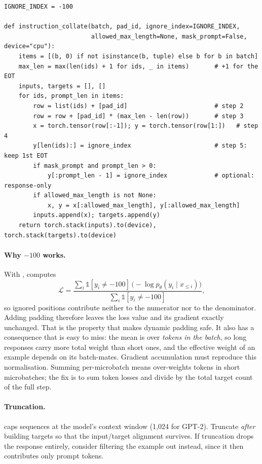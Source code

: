 \begin{lstlisting}[caption={The instruction collate function (from \ident{llmsys/finetune.py}).},label={lst:instruct:collate}]
IGNORE_INDEX = -100

def instruction_collate(batch, pad_id, ignore_index=IGNORE_INDEX,
                        allowed_max_length=None, mask_prompt=False, device="cpu"):
    items = [(b, 0) if not isinstance(b, tuple) else b for b in batch]
    max_len = max(len(ids) + 1 for ids, _ in items)       # +1 for the EOT
    inputs, targets = [], []
    for ids, prompt_len in items:
        row = list(ids) + [pad_id]                        # step 2
        row = row + [pad_id] * (max_len - len(row))       # step 3
        x = torch.tensor(row[:-1]); y = torch.tensor(row[1:])   # step 4
        y[len(ids):] = ignore_index                       # step 5: keep 1st EOT
        if mask_prompt and prompt_len > 0:
            y[:prompt_len - 1] = ignore_index             # optional: response-only
        if allowed_max_length is not None:
            x, y = x[:allowed_max_length], y[:allowed_max_length]
        inputs.append(x); targets.append(y)
    return torch.stack(inputs).to(device), torch.stack(targets).to(device)
\end{lstlisting}

\paragraph{Why $-100$ works.} With , 
computes
\begin{equation}
\mathcal{L} = \frac{\sum_{i}\mathbb{1}[y_i \neq -100]\,\bigl(-\log p_\theta(y_i\mid x_{\le i})\bigr)}
                   {\sum_i \mathbb{1}[y_i\neq -100]},
\label{eq:instruct:masked}
\end{equation}
so ignored positions contribute neither to the numerator nor to the denominator. Adding
padding therefore leaves the loss value and its gradient exactly unchanged. That is the
property that makes dynamic padding safe. It also has a consequence that is easy to
miss: the mean is over \emph{tokens in the batch}, so long responses carry more total
weight than short ones, and the effective weight of an example depends on its
batch-mates. Gradient accumulation must reproduce this normalisation. Summing
per-microbatch means over-weights tokens in short microbatches; the fix is to sum
token losses and divide by the total target count of the full step.

\paragraph{Truncation.}  caps sequences at the model's
context window (1{,}024 for GPT-2). Truncate \emph{after} building targets so that the
input/target alignment survives. If truncation drops the response entirely, consider
filtering the example out instead, since it then contributes only prompt tokens.

